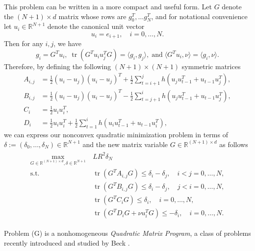\documentclass[12pt]{article}
\numberwithin{equation}{section}
\theoremstyle{definition}
\theoremstyle{remark}
\DeclareMathOperator{\trace}{tr}
\def\real{\mathbb{R}}
\begin{document}
This problem can be written  in a more compact and useful form. Let $G$ denote the
$(N+1)\times d$ matrix whose rows are $g_0^T,\dots g_N^T$, and  for notational convenience let
$u_i\in\mathbb{R}^{N+1}$ denote the canonical unit vector
\[
    u_i = e_{i+1}, \quad i=0,\dots,N.
\]
Then for any $i,j$, we have
\[
   g_i= G^T u_i,\; \trace (G^T u_i u_j^T G)=\langle g_i, g_j \rangle, \;\mbox{and}\; \langle G^T u_i,\nu \rangle=\langle g_i, \nu\rangle.
\]
Therefore, by defining the following $(N+1)\times (N+1)$ symmetric matrices
\begin{equation}\label{E:gradientmatrices}
\begin{aligned}
    A_{i,j} &= \frac{1}{2} (u_i-u_j)(u_i-u_j)^T + \frac{1}{2}\sum_{t=i+1}^{j} h (u_j u_{t-1}^T+u_{t-1} u_j^T),\\
    B_{i,j} &= \frac{1}{2} (u_i-u_j)(u_i-u_j)^T -  \frac{1}{2}\sum_{t=j+1}^{i} h (u_j u_{t-1}^T+u_{t-1} u_j^T),\\
    C_i &= \frac{1}{2} u_i u_i^T,\\
    D_i &= \frac{1}{2} u_i u_i^T+ \frac{1}{2}\sum_{t=1}^{i} h (u_i u_{t-1}^T + u_{t-1} u_i^T),
\end{aligned}
\end{equation}
we can express our nonconvex quadratic minimization problem in terms of
$\delta:=(\delta_0,\dots,\delta_N) \in \real^{N+1}$
and the new matrix variable $G\in \mathbb{R}^{(N+1)\times d}$ as follows
\begin{align*}
    \begin{aligned}
    \max_{G\in \mathbb{R}^{(N+1)\times d},\delta \in\mathbb{R}^{N+1}}\ &  LR^2 \delta_N \\
    \text{s.t. }
                        & \trace (G^T A_{i,j} G) \leq \delta_i - \delta_j,\quad    i<j=0,\dots,N, \\
                        & \trace(G^T B_{i,j} G) \leq \delta_i - \delta_j,\quad      j<i=0,\dots,N, \\
                        & \trace(G^T C_i G) \leq \delta_i,\quad                             i=0,\dots,N, \\
                        & \trace(G^T D_i G+ \nu u_i^T G ) \leq - \delta_i,\quad     i=0,\dots,N.
    \end{aligned}
    \tag{G}\label{P:gbound}
\end{align*}

Problem (G) is a nonhomogeneous {\em Quadratic Matrix Program}, a class of problems recently
introduced and studied by Beck \cite{beck-qm06}.
\end{document}
